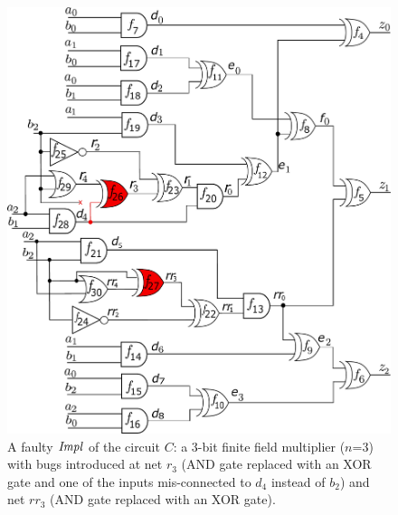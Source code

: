 
\begin{figure}[hbt]
    \begin{center}
    \includegraphics[scale = 0.35]{mas_3_ddc_mfr_a.pdf}
    \end{center}
    \caption{{\footnotesize  
        A faulty ${\it Impl}$ of the circuit $C$: a 3-bit finite
        field multiplier ($n$=3) with bugs introduced at net $r_3$
        (AND gate replaced with an XOR gate and one of the inputs
        mis-connected to $d_4$ instead of $b_2$) and net $rr_3$ (AND gate
        replaced with an XOR gate).}}  
    \label{fig:mas_bug_W}
\end{figure}
